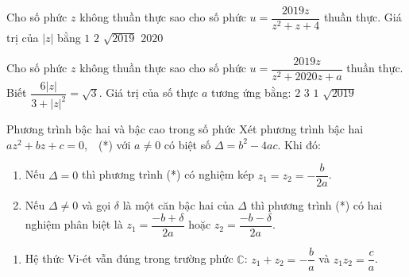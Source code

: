 \begin{ex}
\begin{ex}[2D4K3-3]
{}
\end{ex}
\begin{ex}[2D4K3-3]
Cho số phức $z$ không thuần thực sao cho số phức $u=\dfrac{2019 z}{z^2+z+4}$ thuần thực. Giá trị của $|z|$ bằng
\choice
{$1$}
{\True$2$}
{$\sqrt{2019}$}
{$2020$}
\end{ex}
\begin{ex}[2D4K3-3]
Cho số phức $z$ không thuần thực sao cho số phức $u=\dfrac{2019 z}{z^2+2020 z+a}$ thuần thực. Biết $\dfrac{6|z|}{3+|z|^2}=\sqrt{3}$. Giá trị của số thực $a$ tương ứng bằng:
\choice
{$2$}
{\True$3$}
{$1$}
{$\sqrt{2019}$}
\end{ex}
\begin{dang}{Phương trình bậc hai và bậc cao trong số phức}
	Xét phương trình bậc hai $az^2 + bz + c = 0$, \,\, (*) với $a \neq 0$ có biệt số $\Delta = b^2 - 4ac$. Khi đó:
	\begin{enumerate}
		\item Nếu $\Delta = 0$ thì phương trình (*) có nghiệm kép $z_1 = z_2 = -\dfrac{b}{2a}$.
		\item Nếu $\Delta \neq 0$ và gọi $\delta$ là một căn bậc hai của $\Delta$ thì phương trình (*) có hai nghiệm phân biệt là $z_1 = \dfrac{-b + \delta}{2a}$ hoặc $z_2 = \dfrac{-b - \delta}{2a}$.
	\end{enumerate}
	\begin{note}
		\begin{enumerate}
			\item Hệ thức Vi-ét vẫn đúng trong trường phức $\mathbb{C}$: $z_1 + z_2 = -\dfrac{b}{a}$ và $z_1 z_2 = \dfrac{c}{a}$.

\end{enumerate}
\end{note}
\end{dang}
\end{ex}
